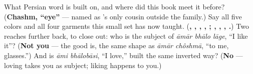 \begin{tcolorbox}[breakable,colback=teal!4,colframe=teal!35!black,title={Before you move on}]
What Persian word is  built on, and where did this book meet it before? (\textbf{Chashm, \textquotedblleft{}eye\textquotedblright{}} — named as 's only cousin outside the family.) Say all five colors and all four garments this small set has now taught. (\textbf{, , , , ; , , , .}) Two reaches further back, to close out: who is the subject of \emph{āmār bhālo lāge}, \textquotedblleft{}I like it\textquotedblright{}? (\textbf{Not you} — the good is, the same shape as \emph{āmār chôshmā}, \textquotedblleft{}to me, glasses.\textquotedblright{}) And is \emph{āmi bhālobāsi}, \textquotedblleft{}I love,\textquotedblright{} built the same inverted way? (\textbf{No} — loving takes you as subject; liking happens to you.)
\end{tcolorbox}
